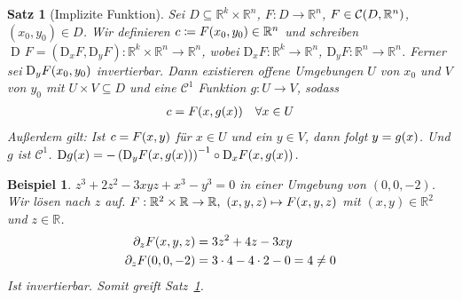 \documentclass[11pt, twoside, a4paper]{article}
\theoremstyle{plain}
\newtheorem{satz}[blockelement]{Satz}
\newtheorem{beispiel}[blockelement]{Beispiel}
\numberwithin{equation}{subsection}
\newcommand{\pair}[1]{\left(#1\right)}
\newcommand{\of}[1]{\mathopen{}\mathclose{}\bgroup\left(#1\aftergroup\egroup\right)}
\newcommand{\fromto}{\rightarrow{}}
\DeclareMathOperator{\D}{D\!}
\newcommand{\R}{\mathbb{R}}
\newcommand{\mC}{\mathcal{C}}
\begin{document}
    \begin{satz}[Implizite Funktion] %
        \label{satz:implizit-funktion}
        Sei $D\subseteq\R^k\times\R^n$, $F: D\fromto\R^n$, $F\in\mC\of{D, \R^n}$, $\pair{x_0, y_0}\in D$. Wir definieren $c\coloneqq F\of{x_0, y_0}\in\R^n$ und schreiben $\D F = \pair{\text{D}_x F, \text{D}_y F}: \R^k\times \R^n\to\R^n$, wobei $\text{D}_x F: \R^k\to\R^n$, $\text{D}_y F: \R^n\to\R^n$. Ferner sei $\text{D}_y F\of{x_0, y_0}$ invertierbar. Dann existieren offene Umgebungen $U$ von $x_0$ und $V$ von $y_0$ mit $U\times V \subseteq D$ und eine $\mC^{1}$ Funktion $g: U\to V$, sodass
        \begin{align*}
            c = F\of{x, g\of{x}}\quad\forall x\in U
        \end{align*}
        Außerdem gilt: Ist $c=F\of{x,y}$ für $x\in U$ und ein $y\in V$, dann folgt $y=g\of{x}$. Und $g$ ist $\mC^1$. $\D g\of{x} = -\pair{\text{D}_y F\of{x, g\of{x}}}^{-1}\circ \text{D}_x F\of{x,g\of{x}}$.
    \end{satz}

    \begin{beispiel}
        $z^3 + 2z^2 - 3xyz + x^3 - y^3 = 0$ in einer Umgebung von $\pair{0,0,-2}$. Wir lösen nach $z$ auf. $F: \R^2\times\R\to\R,~\pair{x,y,z}\mapsto F\of{x,y,z}$ mit $\pair{x,y}\in\R^2$ und $z\in\R$.
        \begin{align*}
            \partial_z F\of{x,y,z} &= 3z^2 + 4z - 3xy\\
            \partial_z F\of{0,0,-2} &= 3\cdot 4 - 4\cdot 2 - 0 = 4\neq 0
        \end{align*}
        Ist invertierbar. Somit greift Satz~\ref{satz:implizit-funktion}.
    \end{beispiel}
\end{document}
